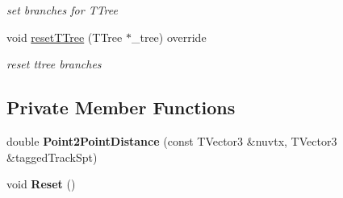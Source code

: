 \begin{DoxyCompactItemize}
\begin{DoxyCompactList}\small\item\em set branches for T\-Tree \end{DoxyCompactList}\item 
\hypertarget{classanalysis_1_1CRTApproachAnalysis_a82b4234fdad706613efdb29fb89e8581}{void \hyperlink{classanalysis_1_1CRTApproachAnalysis_a82b4234fdad706613efdb29fb89e8581}{reset\-T\-Tree} (T\-Tree $\ast$\-\_\-tree) override}\label{classanalysis_1_1CRTApproachAnalysis_a82b4234fdad706613efdb29fb89e8581}

\begin{DoxyCompactList}\small\item\em reset ttree branches \end{DoxyCompactList}\end{DoxyCompactItemize}
\subsection*{Private Member Functions}
\begin{DoxyCompactItemize}
\item 
\hypertarget{classanalysis_1_1CRTApproachAnalysis_aad7633096ac24f335774fee3908b5cb7}{double {\bfseries Point2\-Point\-Distance} (const T\-Vector3 \&nuvtx, T\-Vector3 \&tagged\-Track\-Spt)}\label{classanalysis_1_1CRTApproachAnalysis_aad7633096ac24f335774fee3908b5cb7}

\item 
\hypertarget{classanalysis_1_1CRTApproachAnalysis_abff1e05cb70a3d88d03d3ef670c114e7}{void {\bfseries Reset} ()}\label{classanalysis_1_1CRTApproachAnalysis_abff1e05cb70a3d88d03d3ef670c114e7}

\end{DoxyCompactItemize}
